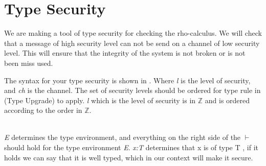 \section{Type Security}
We are making a tool of type security for checking the rho-calculus.
We will check that a message of high security level can not be send on a channel of low security level.
This will ensure that the integrity of the system is not broken or is not been miss used.


\noindent The syntax for your type security is shown in . Where \textit{l} is the level of security, and \textit{ch} is the channel. The set of security levels should be ordered for type rule in  (Type Upgrade) to apply. \textit{l} which is the level of security is in $ \mathbb{Z} $ and is ordered according to the order in $ \mathbb{Z} $.\\\\


\noindent \textit{E} determines the type environment, and everything on the right side of the $ \vdash $ should hold for the type environment \textit{E}. \textit{x:T} determines that x is of type T , if it holds we can say that it is well typed, which in our context will make it secure.

